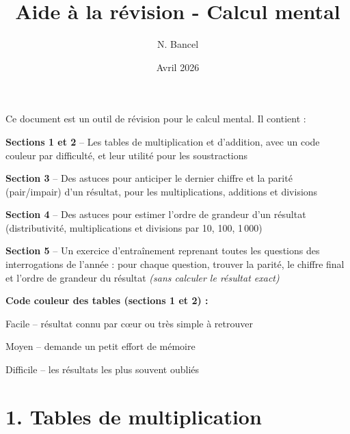 \documentclass{exam}
\title{Aide à la révision - Calcul mental}
\author{N. Bancel}
\date{Avril 2026}
\begin{document}
{\let\newpage\relax\maketitle}

\begin{Indication}
Ce document est un outil de révision pour le calcul mental. Il contient :
\begin{compactitem}
\item \textbf{Sections 1 et 2} -- Les tables de multiplication et d'addition, avec un code couleur par difficulté, et leur utilité pour les soustractions
\item \textbf{Section 3} -- Des astuces pour anticiper le dernier chiffre et la parité (pair/impair) d'un résultat, pour les multiplications, additions et divisions
\item \textbf{Section 4} -- Des astuces pour estimer l'ordre de grandeur d'un résultat (distributivité, multiplications et divisions par 10, 100, 1\,000)
\item \textbf{Section 5} -- Un exercice d'entraînement reprenant toutes les questions des interrogations de l'année : pour chaque question, trouver la parité, le chiffre final et l'ordre de grandeur du résultat \textit{(sans calculer le résultat exact)}
\end{compactitem}

\vspace{0.5em}
\textbf{Code couleur des tables (sections 1 et 2) :}
\begin{compactitem}
\item \colorbox{facile}{\strut\hspace{1em}} Facile -- résultat connu par c\oe ur ou très simple à retrouver
\item \colorbox{moyen}{\strut\hspace{1em}} Moyen -- demande un petit effort de mémoire
\item \colorbox{difficile}{\strut\hspace{1em}} Difficile -- les résultats les plus souvent oubliés
\end{compactitem}
\end{Indication}

\section*{\textcolor{blue!80!black}{1. Tables de multiplication}}
\end{document}
